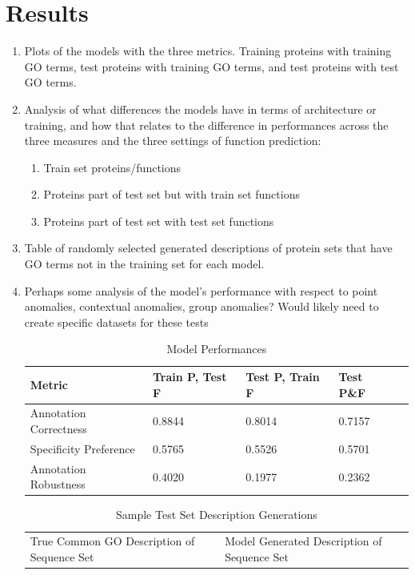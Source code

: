 \documentclass{specification}
\begin{document}
\section{Results}
\begin{enumerate}
    \item Plots of the models with the three metrics.
Training proteins with training GO terms, test proteins with training GO terms, and test proteins with test GO terms.
    \item Analysis of what differences the models have in terms of architecture or training, and how that relates to the difference in performances across the three measures and the three settings of function prediction:
        \begin{enumerate}
            \item Train set proteins/functions
            \item Proteins part of test set but with train set functions
            \item Proteins part of test set with test set functions
        \end{enumerate}
    \item Table of randomly selected generated descriptions of protein sets that have GO terms not in the training set for each model.
    \item Perhaps some analysis of the model's performance with respect to point anomalies, contextual anomalies, group anomalies? Would likely need to create specific datasets for these tests
\begin{table}
	\caption{Model Performances}
	\centering
	\begin{tabular}{l|llll}
		\toprule
        Metric & Train P, Test F & Test P, Train F & Test P\&F \\
		\midrule
        Annotation Correctness & 0.8844 & 0.8014 & 0.7157 \\
        Specificity Preference & 0.5765 & 0.5526 & 0.5701 \\
		Annotation Robustness & 0.4020 & 0.1977 & 0.2362 \\
		\bottomrule
	\end{tabular}
	\label{tab:table}
\end{table}
\begin{table}
	\caption{Sample Test Set Description Generations}
	\centering
    \begin{tabular}{p{8 cm}|p{8 cm}}
		\toprule
        True Common GO Description of Sequence Set & Model Generated Description of Sequence Set \\

\end{tabular}
\end{table}
\end{enumerate}
\end{document}
